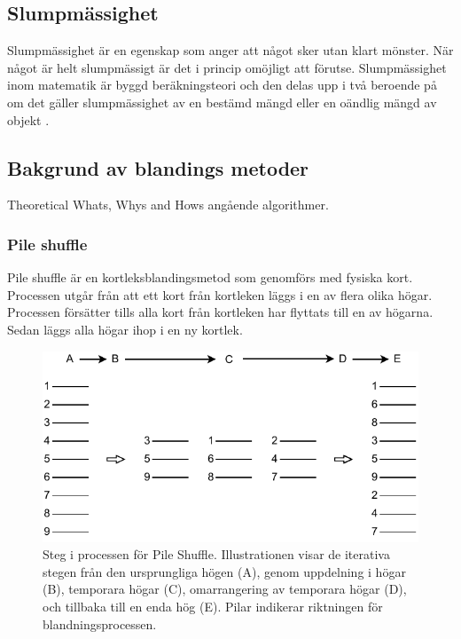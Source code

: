 \documentclass[swedish,a4paper]{article}
\begin{document}
\subsection{Slumpmässighet}

Slumpmässighet är en egenskap som anger att något sker utan klart mönster. När
något är helt slumpmässigt är det i princip omöjligt att förutse. Slumpmässighet
inom matematik är byggd beräknings\-teori och den delas upp i två beroende på om
det gäller slumpmässighet av en bestämd mängd eller en oändlig mängd av objekt
\parencite[49-66]{Terwijn2016}.

\subsection{Bakgrund av blandings metoder}
Theoretical Whats, Whys and Hows angående algorithmer.

\subsubsection{Pile shuffle}
\label{sec:pile_shuffle}
Pile shuffle är en kortleksblandingsmetod som genomförs med fysiska
kort. Processen utgår från att ett kort
från kortleken läggs i en av flera olika högar. Processen försätter
tills alla kort från kortleken har flyttats till en av högarna. Sedan
läggs  alla högar ihop i en ny kortlek. 


\begin{figure}[H]
	\begin{center}
		\includegraphics{images/pile_shuffle.pdf}
	\end{center}
	\captionsetup{justification=centering,margin=4cm}
	\caption{Steg i processen för Pile Shuffle. Illustrationen visar de
	iterativa stegen från den ursprungliga högen (A), genom uppdelning i
	högar (B), temporara högar (C), omarrangering av temporara högar (D),
	och tillbaka till en enda hög (E). Pilar indikerar riktningen för
	blandningsprocessen.
	}
	\label{fig:pile_shuffle_1}
\end{figure}
\end{document}
